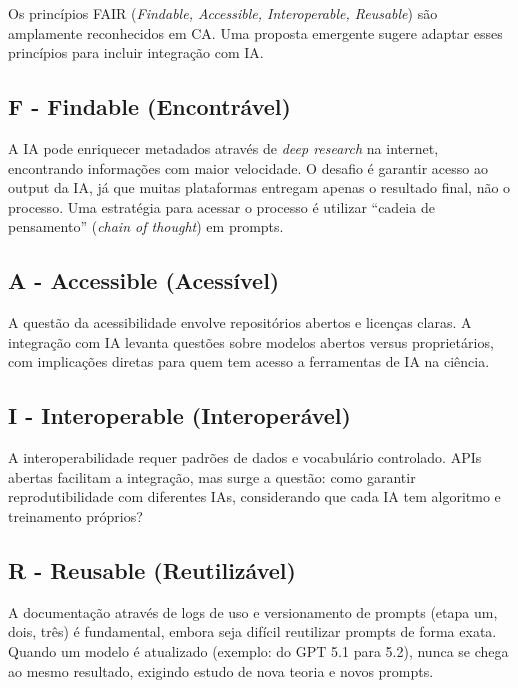 \documentclass[
  a4paper,
]{book}
\begin{document}
Os princípios FAIR (\emph{Findable, Accessible, Interoperable,
Reusable}) são amplamente reconhecidos em CA. Uma proposta emergente
sugere adaptar esses princípios para incluir integração com IA.

\subsection{F - Findable
(Encontrável)}\label{f---findable-encontruxe1vel}

A IA pode enriquecer metadados através de \emph{deep research} na
internet, encontrando informações com maior velocidade. O desafio é
garantir acesso ao output da IA, já que muitas plataformas entregam
apenas o resultado final, não o processo. Uma estratégia para acessar o
processo é utilizar ``cadeia de pensamento'' (\emph{chain of thought})
em prompts.

\subsection{A - Accessible
(Acessível)}\label{a---accessible-acessuxedvel}

A questão da acessibilidade envolve repositórios abertos e licenças
claras. A integração com IA levanta questões sobre modelos abertos
versus proprietários, com implicações diretas para quem tem acesso a
ferramentas de IA na ciência.

\subsection{I - Interoperable
(Interoperável)}\label{i---interoperable-interoperuxe1vel}

A interoperabilidade requer padrões de dados e vocabulário controlado.
APIs abertas facilitam a integração, mas surge a questão: como garantir
reprodutibilidade com diferentes IAs, considerando que cada IA tem
algoritmo e treinamento próprios?

\subsection{R - Reusable
(Reutilizável)}\label{r---reusable-reutilizuxe1vel}

A documentação através de logs de uso e versionamento de prompts (etapa
um, dois, três) é fundamental, embora seja difícil reutilizar prompts de
forma exata. Quando um modelo é atualizado (exemplo: do GPT 5.1 para
5.2), nunca se chega ao mesmo resultado, exigindo estudo de nova teoria
e novos prompts.
\end{document}
